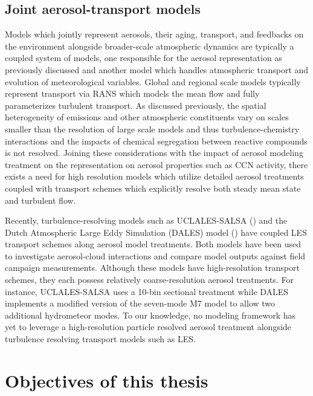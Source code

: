 \subsection{Joint aerosol-transport models}
Models which jointly represent aerosols, their aging, transport, and feedbacks on the environment alongside broader-scale atmospheric dynamics are typically a coupled system of models, one responsible for the aerosol representation as previously discussed and another model which handles atmospheric transport and evolution of meteorological variables. Global and regional scale models typically represent transport via RANS which models the mean flow and fully parameterizes turbulent transport. As discussed previously, the spatial heterogeneity of emissions and other atmospheric constituents vary on scales smaller than the resolution of large scale models and thus turbulence-chemistry interactions and the impacts of chemical segregation between reactive compounds is not resolved. Joining these considerations with the impact of aerosol modeling treatment on the representation on aerosol properties such as CCN activity, there exists a need for high resolution models which utilize detailed aerosol treatments coupled with transport schemes which explicitly resolve both steady mean state and turbulent flow.

Recently, turbulence-resolving models such as UCLALES-SALSA (\cite{tonttila_uclalessalsa_2017}) and the Dutch Atmospheric Large Eddy Simulation (DALES) model (\cite{de_bruine_explicit_2019}) have coupled LES transport schemes along aerosol model treatments. Both models have been used to investigate aerosol-cloud interactions and compare model outputs against field campaign measurements. Although these models have high-resolution transport schemes, they each possess relatively coarse-resolution aerosol treatments. For instance, UCLALES-SALSA uses a 10-bin sectional treatment while DALES implements a modified version of the seven-mode M7 model to allow two additional hydrometeor modes. To our knowledge, no modeling framework has yet to leverage a high-resolution particle resolved aerosol treatment alongside turbulence resolving transport models such as LES. 

\section{Objectives of this thesis}

